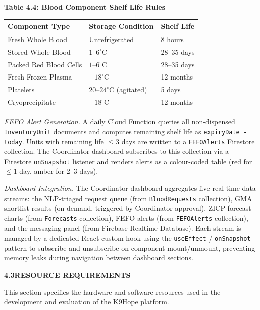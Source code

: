 \documentclass[12pt,a4paper]{article}
\begin{document}
\begin{center}
\textbf{Table 4.4: Blood Component Shelf Life Rules}
\vspace{0.4em}
\begin{tabular}{lll}
\toprule
\textbf{Component Type} & \textbf{Storage Condition} & \textbf{Shelf Life} \\
\midrule
Fresh Whole Blood & Unrefrigerated & 8 hours \\
Stored Whole Blood & $1$--$6^\circ$C & 28--35 days \\
Packed Red Blood Cells & $1$--$6^\circ$C & 28--35 days \\
Fresh Frozen Plasma & $-18^\circ$C & 12 months \\
Platelets & $20$--$24^\circ$C (agitated) & 5 days \\
Cryoprecipitate & $-18^\circ$C & 12 months \\
\bottomrule
\end{tabular}
\end{center}

\noindent\textit{FEFO Alert Generation.} A daily Cloud Function queries all non-dispensed \texttt{InventoryUnit} documents and computes remaining shelf life as \texttt{expiryDate - today}. Units with remaining life $\leq 3$ days are written to a \texttt{FEFOAlerts} Firestore collection. The Coordinator dashboard subscribes to this collection via a Firestore \texttt{onSnapshot} listener and renders alerts as a colour-coded table (red for $\leq 1$ day, amber for 2--3 days).

\noindent\textit{Dashboard Integration.} The Coordinator dashboard aggregates five real-time data streams: the NLP-triaged request queue (from \texttt{BloodRequests} collection), GMA shortlist results (on-demand, triggered by Coordinator approval), ZICP forecast charts (from \texttt{Forecasts} collection), FEFO alerts (from \texttt{FEFOAlerts} collection), and the messaging panel (from Firebase Realtime Database). Each stream is managed by a dedicated React custom hook using the \texttt{useEffect} / \texttt{onSnapshot} pattern to subscribe and unsubscribe on component mount/unmount, preventing memory leaks during navigation between dashboard sections.

\vspace{1.5em}
\noindent\textbf{4.3\quad RESOURCE REQUIREMENTS}
\vspace{0.6em}

\noindent This section specifies the hardware and software resources used in the development and evaluation of the K9Hope platform.
\end{document}
